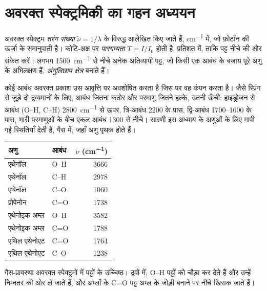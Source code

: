 \section{अवरक्त स्पेक्ट्रमिकी का गहन अध्ययन}

\begin{definition}[तरंग संख्या, पारगम्यता, अंगुलिछाप क्षेत्र]\label{def:b1:structure-spectroscopy:wavenumber}
अवरक्त स्पेक्ट्रम \emph{तरंग संख्या}
$\tilde\nu = 1/\lambda$ के विरुद्ध आलेखित किए जाते हैं, \unit{cm^{-1}} में, जो फ़ोटॉन की
ऊर्जा के समानुपाती है। कोटि-अक्ष पर \emph{पारगम्यता}
$T = I/I_0$ होती है, प्रतिशत में, ताकि पट्ट नीचे की ओर संकेत करें। लगभग
\qty{1500}{cm^{-1}} से नीचे अनेक अतिव्यापी पट्ट, जो किसी एक आबंध के बजाय पूरे
अणु के अभिलक्षण हैं, \emph{अंगुलिछाप
क्षेत्र} बनाते हैं।
\end{definition}

कोई आबंध अवरक्त प्रकाश उस आवृत्ति पर अवशोषित करता है जिस पर वह कंपन करता है। जैसे
स्प्रिंग से जुड़े दो द्रव्यमानों के लिए, आबंध जितना कठोर और परमाणु जितने
हल्के,  उतनी ऊँची: हाइड्रोजन से आबंध (O--H, C--H)
\qty{2800}{cm^{-1}} से ऊपर, त्रि-आबंध 2200 के पास, द्वि-आबंध
1700--1600 के पास, भारी परमाणुओं के बीच एकल आबंध 1300 से नीचे। सारणी
इस अध्याय के अणुओं के लिए मापी गई स्थितियाँ देती है, गैस  में,
जहाँ अणु पृथक होते हैं।

\begin{omfigure}
\begin{tabular}{llr}
\hline
अणु & आबंध & $\tilde\nu$ (\unit{cm^{-1}}) \\
\hline
एथेनॉल & O--H & 3666 \\
एथेनॉल & C--H & 2978 \\
एथेनॉल & C--O & 1060 \\
प्रोपेनोन & C=O & 1738 \\
एथेनोइक अम्ल & O--H & 3582 \\
एथेनोइक अम्ल & C=O & 1788 \\
एथिल एथेनोएट & C=O & 1764 \\
एथिल एथेनोएट & C--O & 1238 \\
\hline
\end{tabular}

\smallskip
{\small गैस-प्रावस्था अवरक्त स्पेक्ट्रमों में पट्टों के उच्चिष्ठ। द्रवों में,  O--H पट्टों को चौड़ा कर देते हैं और उन्हें निम्नतर  की ओर ले जाते हैं, और
अम्लों के C=O पट्ट अम्ल के जोड़ी बनाने पर नीचे खिसक जाते हैं।}
\end{omfigure}

